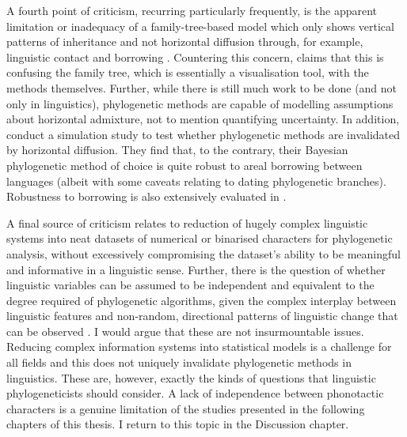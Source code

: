 A fourth point of criticism, recurring particularly frequently, is the apparent limitation or inadequacy of a family-tree-based model which only shows vertical patterns of inheritance and not horizontal diffusion through, for example, linguistic contact and borrowing \autocites{bateman_speaking_1990}{donohue_new_2012}{gould_urchin_1987}. Countering this concern, \textcite{bowern_historical_2010} claims that this is confusing the family tree, which is essentially a visualisation tool, with the methods themselves. Further, while there is still much work to be done (and not only in linguistics), phylogenetic methods are capable of modelling assumptions about horizontal admixture, not to mention quantifying uncertainty. In addition, \textcite{greenhill_does_2009} conduct a simulation study to test whether phylogenetic methods are invalidated by horizontal diffusion. They find that, to the contrary, their Bayesian phylogenetic method of choice is quite robust to areal borrowing between languages (albeit with some caveats relating to dating phylogenetic branches). Robustness to borrowing is also extensively evaluated in \textcite{bouckaert_origin_2018}.

A final source of criticism relates to reduction of hugely complex linguistic systems into neat datasets of numerical or binarised characters for phylogenetic analysis, without excessively compromising the dataset's ability to be meaningful and informative in a linguistic sense. Further, there is the question of whether linguistic variables can be assumed to be independent and equivalent to the degree required of phylogenetic algorithms, given the complex interplay between linguistic features and non-random, directional patterns of linguistic change that can be observed \autocites{heggarty_interdisciplinary_2006}{round_design_2015}. I would argue that these are not insurmountable issues. Reducing complex information systems into statistical models is a challenge for all fields \autocite{round_comparability_2020} and this does not uniquely invalidate phylogenetic methods in linguistics. These are, however, exactly the kinds of questions that linguistic phylogeneticists should consider. A lack of independence between phonotactic characters is a genuine limitation of the studies presented in the following chapters of this thesis. I return to this topic in the Discussion chapter.


